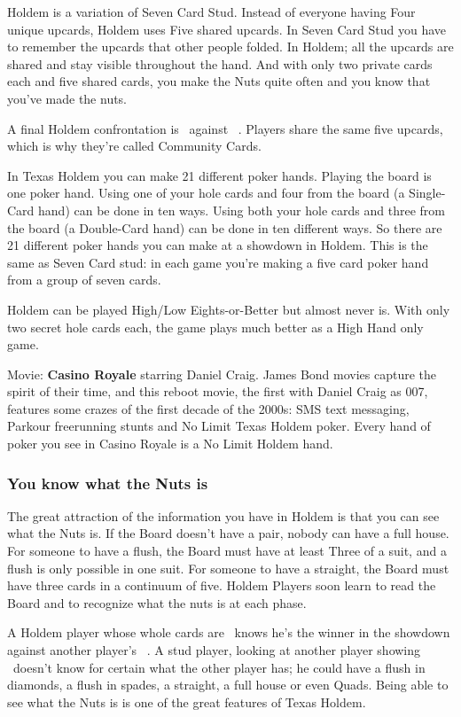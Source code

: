 Holdem is a variation of Seven Card Stud. Instead of everyone
having Four unique upcards, Holdem uses Five shared upcards. In Seven
Card Stud you have to remember the upcards that other people
folded. In Holdem; all the upcards are shared and stay visible
throughout the hand. And with only two private cards each and five
shared cards, you make the Nuts quite often and you know that you've
made the nuts.

A final Holdem confrontation is
\back\back\nines\Qd\Jd\tres\fourc\ against
\back\back\nines\Qd\Jd\tres\fourc\ . Players share the same five
upcards, which is why they're called Community Cards.

In Texas Holdem you can make 21 different poker hands. Playing the
board is one poker hand. Using one of your hole cards and four from the
board (a Single-Card hand) can be done in ten ways. Using both your
hole cards and three from the board (a Double-Card hand) can be done
in ten different ways. So there are 21 different poker hands you can
make at a showdown in Holdem. This is the same as Seven Card
stud: in each game you're making a five card poker hand from a
group of seven cards.

Holdem can be played High/Low Eights-or-Better but almost never
is. With only two secret hole cards each, the game plays much better
as a High Hand only game.

Movie: \textbf{Casino Royale} starring Daniel Craig. James Bond movies
capture the spirit of their time, and this reboot movie, the first
with Daniel Craig as 007, features some crazes of the first decade of
the 2000s: SMS text messaging, Parkour freerunning stunts and No Limit
Texas Holdem poker. Every hand of poker you see in Casino Royale is a
No Limit Holdem hand.

\subsubsection{You know what the Nuts is}

The great attraction of the information you have in Holdem is that you
can see what the Nuts is. If the Board doesn't have a pair, nobody can
have a full house. For someone to have a flush, the Board must have at
least Three of a suit, and a flush is only possible in one suit. For
someone to have a straight, the Board must have three cards in a
continuum of five. Holdem Players soon learn to read the Board and to
recognize what the nuts is at each phase.

A Holdem player whose whole cards are \Ad\tred\ knows he's the winner
in the showdown against another player's
\back\back\nines\Qd\Jd\tres\fourd\ . A stud player, looking at another
player showing \back\back\nines\Qd\Jd\tres\back\ doesn't know for
certain what the other player has; he could have a flush in diamonds,
a flush in spades, a straight, a full house or even Quads. Being able
to see what the Nuts is is one of the great features of Texas Holdem.

